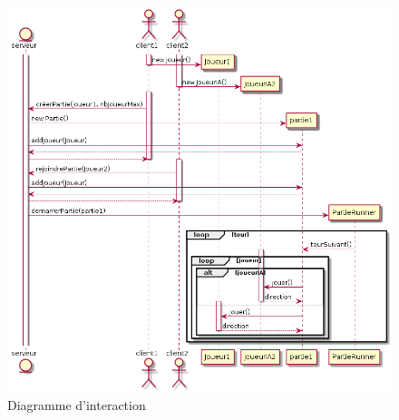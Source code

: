 
\begin{figure}[h]%
	\includegraphics[width=\columnwidth]{images/UML_DiagSequence.png}%
	\caption{Diagramme d'interaction}%
	\label{fig:useCase}%
\end{figure}
